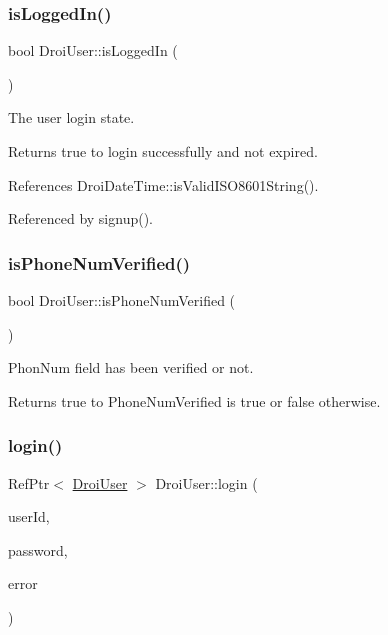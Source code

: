 \subsubsection{\texorpdfstring{is\+Logged\+In()}{isLoggedIn()}}
{\footnotesize\ttfamily bool Droi\+User\+::is\+Logged\+In (\begin{DoxyParamCaption}{ }\end{DoxyParamCaption})}

The user login state. \begin{DoxyReturn}{Returns}
true to login successfully and not expired. 
\end{DoxyReturn}


References Droi\+Date\+Time\+::is\+Valid\+I\+S\+O8601\+String().



Referenced by signup().

\mbox{\label{class_droi_user_a0d62ee68696b5e09200fcd4f8826bcb0}} 
\subsubsection{\texorpdfstring{is\+Phone\+Num\+Verified()}{isPhoneNumVerified()}}
{\footnotesize\ttfamily bool Droi\+User\+::is\+Phone\+Num\+Verified (\begin{DoxyParamCaption}{ }\end{DoxyParamCaption})}

Phon\+Num field has been verified or not.

\begin{DoxyReturn}{Returns}
true to Phone\+Num\+Verified is true or false otherwise. 
\end{DoxyReturn}
\mbox{\label{class_droi_user_a673787980cbb072df89cdf72239e7984}} 
\subsubsection{\texorpdfstring{login()}{login()}}
{\footnotesize\ttfamily Ref\+Ptr$<$ \hyperlink{class_droi_user}{Droi\+User} $>$ Droi\+User\+::login (\begin{DoxyParamCaption}\item[{const std\+::string \&}]{user\+Id,  }\item[{const std\+::string \&}]{password,  }\item[{\hyperlink{class_droi_error}{Droi\+Error} $\ast$}]{error }\end{DoxyParamCaption})\hspace{0.3cm}{\ttfamily [static]}}

